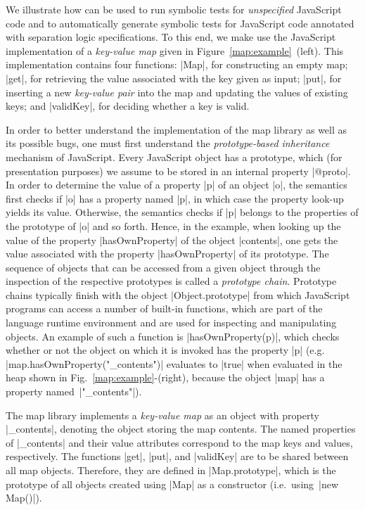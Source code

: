 
We illustrate how \jilette can be used to run symbolic tests for \emph{unspecified} JavaScript code 
and to automatically generate symbolic tests for JavaScript code annotated with separation logic specifications. 
To this end, we make use the JavaScript implementation 
of a  \emph{key-value map} given in Figure~\ref{map:example}~(left). 
This implementation contains four functions: 
\jsinline|Map|, for constructing an empty map;
\jsinline|get|, for retrieving the value associated with the key given as input;
\jsinline|put|, for inserting a new \emph{key-value pair} into the map and updating the values of existing keys; and
\jsinline|validKey|, for deciding whether a key is valid.

In order to better understand the implementation of the map library as well as its possible bugs, 
one must first understand the \emph{prototype-based inheritance} mechanism of JavaScript. 
Every JavaScript object has a prototype, which (for presentation purposes) we assume to 
be stored  in an internal property \jsinline|@proto|. In order to determine the value of a property
\jsinline|p| of an object \jsinline|o|, the semantics first checks if \jsinline|o| has a 
property named \jsinline|p|, in which case the property look-up yields its value. Otherwise, the 
semantics checks if \jsinline|p| belongs to the properties of the prototype of \jsinline|o| and so 
forth. Hence, in the example, when looking up the value of the property \jsinline|hasOwnProperty|
of the object \jsinline|contents|, one gets the value associated with the property  \jsinline|hasOwnProperty|
of its prototype.
The sequence of objects that can be accessed from a given object through the inspection 
of the respective prototypes is called a \emph{prototype chain}.
Prototype chains typically finish with the object \jsinline|Object.prototype| from which JavaScript 
programs can access a number of built-in functions, which are part of the language runtime environment and are used for inspecting and manipulating objects.
An example of such a function is \jsinline|hasOwnProperty(p)|, which checks whether or not the object 
on which it is invoked has the property \jsinline|p| (e.g. {\small \jsinline|map.hasOwnProperty("_contents")|}
evaluates to \jsinline|true| when evaluated in the heap shown in Fig.~\ref{map:example}-(right), 
because the object \jsinline|map| has a property named~\jsinline|"_contents"|). 

The map library implements a \emph{key-value map} as an object with property \jsinline|_contents|, denoting the object storing the map contents.  
The named properties of \jsinline|_contents| and their value attributes correspond to the map keys and values, respectively.
The functions \jsinline|get|, \jsinline|put|, and \jsinline|validKey| are to be shared between all map 
objects. Therefore, they are defined in \jsinline|Map.prototype|, which is the prototype 
of all objects created using \jsinline|Map| as a constructor (i.e.~using~\jsinline|new Map()|).

